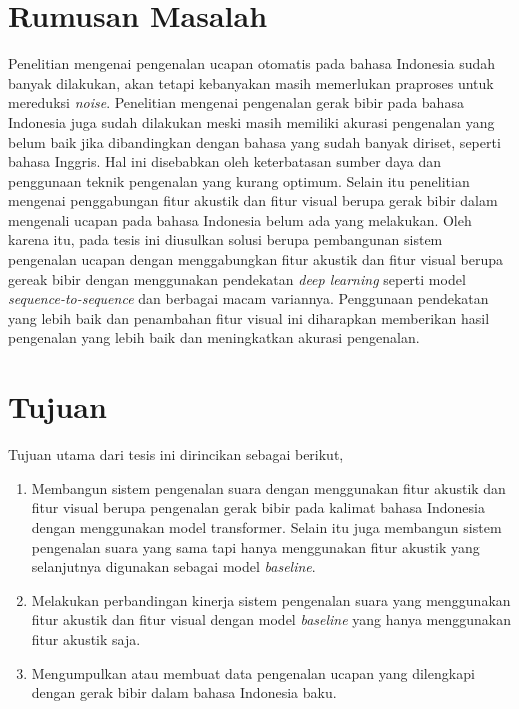 \section{Rumusan Masalah}

Penelitian mengenai pengenalan ucapan otomatis pada bahasa Indonesia sudah banyak dilakukan, akan tetapi kebanyakan masih memerlukan praproses untuk mereduksi \textit{noise}. Penelitian mengenai pengenalan gerak bibir pada bahasa Indonesia juga sudah dilakukan meski masih memiliki akurasi pengenalan yang belum baik jika dibandingkan dengan bahasa yang sudah banyak diriset, seperti bahasa Inggris. Hal ini disebabkan oleh keterbatasan sumber daya dan penggunaan teknik pengenalan yang kurang optimum. Selain itu penelitian mengenai penggabungan fitur akustik dan fitur visual berupa gerak bibir dalam mengenali ucapan pada bahasa Indonesia belum ada yang melakukan. Oleh karena itu, pada tesis ini diusulkan solusi berupa pembangunan sistem pengenalan ucapan dengan menggabungkan fitur akustik dan fitur visual berupa gereak bibir dengan menggunakan pendekatan \textit{deep learning} seperti model \textit{sequence-to-sequence} dan berbagai macam variannya. Penggunaan pendekatan yang lebih baik dan penambahan fitur visual ini diharapkan memberikan hasil pengenalan yang lebih baik dan meningkatkan akurasi pengenalan.


\section{Tujuan}

Tujuan utama dari tesis ini dirincikan sebagai berikut,

\begin{enumerate}
    \item Membangun sistem pengenalan suara dengan menggunakan fitur akustik dan fitur visual berupa pengenalan gerak bibir pada kalimat bahasa Indonesia dengan menggunakan model transformer. Selain itu juga membangun sistem pengenalan suara yang sama tapi hanya menggunakan fitur akustik yang selanjutnya digunakan sebagai model \textit{baseline}.
    \item Melakukan perbandingan kinerja sistem pengenalan suara yang menggunakan fitur akustik dan fitur visual dengan model \textit{baseline} yang hanya menggunakan fitur akustik saja.
    \item Mengumpulkan atau membuat data pengenalan ucapan yang dilengkapi dengan gerak bibir dalam bahasa Indonesia baku.
\end{enumerate}


